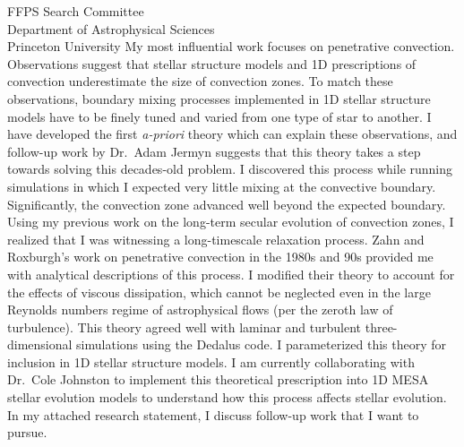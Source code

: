 \documentclass[12pt]{letter}
\begin{document}
\begin{letter}{
               FFPS Search Committee \\
               Department of Astrophysical Sciences \\
               Princeton University
           }
    My most influential work focuses on penetrative convection.
    Observations suggest that stellar structure models and 1D prescriptions of convection underestimate the size of convection zones.
    To match these observations, boundary mixing processes implemented in 1D stellar structure models have to be finely tuned and varied from one type of star to another.
    I have developed the first \emph{a-priori} theory which can explain these observations, and follow-up work by Dr.~Adam Jermyn suggests that this theory takes a step towards solving this decades-old problem.
    I discovered this process while running simulations in which I expected very little mixing at the convective boundary.
    Significantly, the convection zone advanced well beyond the expected boundary.
    Using my previous work on the long-term secular evolution of convection zones, I realized that I was witnessing a long-timescale relaxation process.
    Zahn and Roxburgh's work on penetrative convection in the 1980s and 90s provided me with analytical descriptions of this process.
    I modified their theory to account for the effects of viscous dissipation, which cannot be neglected even in the large Reynolds numbers regime of astrophysical flows (per the zeroth law of turbulence).
    This theory agreed well with laminar and turbulent three-dimensional simulations using the Dedalus code.
    I parameterized this theory for inclusion in 1D stellar structure models.
    I am currently collaborating with Dr.~Cole Johnston to implement this theoretical prescription into 1D MESA stellar evolution models to understand how this process affects stellar evolution.
    In my attached research statement, I discuss follow-up work that I want to pursue.


\end{letter}
\end{document}
